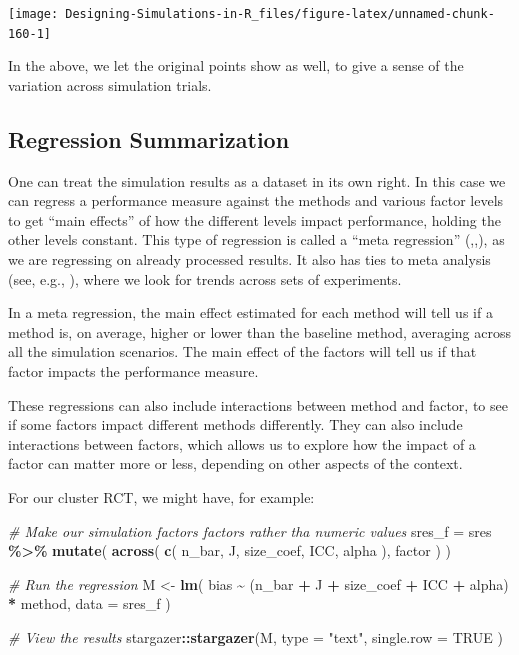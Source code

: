 \documentclass[
]{book}
\newenvironment{Shaded}{\begin{snugshade}}{\end{snugshade}}
\newcommand{\AttributeTok}[1]{\textcolor[rgb]{0.13,0.29,0.53}{#1}}
\newcommand{\CommentTok}[1]{\textcolor[rgb]{0.56,0.35,0.01}{\textit{#1}}}
\newcommand{\ConstantTok}[1]{\textcolor[rgb]{0.56,0.35,0.01}{#1}}
\newcommand{\FunctionTok}[1]{\textcolor[rgb]{0.13,0.29,0.53}{\textbf{#1}}}
\newcommand{\NormalTok}[1]{#1}
\newcommand{\OtherTok}[1]{\textcolor[rgb]{0.56,0.35,0.01}{#1}}
\newcommand{\SpecialCharTok}[1]{\textcolor[rgb]{0.81,0.36,0.00}{\textbf{#1}}}
\newcommand{\StringTok}[1]{\textcolor[rgb]{0.31,0.60,0.02}{#1}}
\begin{document}
\begin{center}\texttt{[image: Designing-Simulations-in-R\_files/figure-latex/unnamed-chunk-160-1]} \end{center}

In the above, we let the original points show as well, to give a sense of the variation across simulation trials.

\subsection{Regression Summarization}\label{regression-summarization}

One can treat the simulation results as a dataset in its own right.
In this case we can regress a performance measure against the methods and various factor levels to get ``main effects'' of how the different levels impact performance, holding the other levels constant.
This type of regression is called a ``meta regression'' (\citet{kleijnen1981regression},\citet{friedman1988metamodel},\citet{gilbert2024multilevel}), as we are regressing on already processed results.
It also has ties to meta analysis (see, e.g., \citet{borenstein2021introduction}), where we look for trends across sets of experiments.

In a meta regression, the main effect estimated for each method will tell us if a method is, on average, higher or lower than the baseline method, averaging across all the simulation scenarios.
The main effect of the factors will tell us if that factor impacts the performance measure.

These regressions can also include interactions between method and factor, to see if some factors impact different methods differently.
They can also include interactions between factors, which allows us to explore how the impact of a factor can matter more or less, depending on other aspects of the context.

For our cluster RCT, we might have, for example:

\begin{Shaded}
\begin{Highlighting}[]
\CommentTok{\# Make our simulation factors factors rather tha numeric values}
\NormalTok{sres\_f }\OtherTok{=}\NormalTok{ sres }\SpecialCharTok{\%\textgreater{}\%}
  \FunctionTok{mutate}\NormalTok{( }\FunctionTok{across}\NormalTok{( }\FunctionTok{c}\NormalTok{( n\_bar, J, size\_coef, ICC, alpha ), factor ) )}

\CommentTok{\# Run the regression}
\NormalTok{M }\OtherTok{\textless{}{-}} \FunctionTok{lm}\NormalTok{( bias }\SpecialCharTok{\textasciitilde{}}\NormalTok{ (n\_bar }\SpecialCharTok{+}\NormalTok{ J }\SpecialCharTok{+}\NormalTok{ size\_coef }\SpecialCharTok{+}\NormalTok{ ICC }\SpecialCharTok{+}\NormalTok{ alpha) }\SpecialCharTok{*}\NormalTok{ method, }
         \AttributeTok{data =}\NormalTok{ sres\_f )}

\CommentTok{\# View the results}
\NormalTok{stargazer}\SpecialCharTok{::}\FunctionTok{stargazer}\NormalTok{(M, }\AttributeTok{type =} \StringTok{"text"}\NormalTok{,}
                     \AttributeTok{single.row =} \ConstantTok{TRUE}\NormalTok{ )}
\end{Highlighting}
\end{Shaded}
\end{document}

